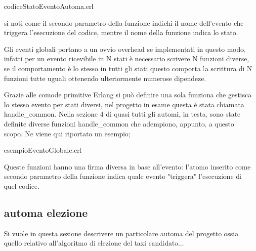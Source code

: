 codiceStatoEventoAutoma.erl

si noti come il secondo parametro della funzione indichi il nome dell'evento che triggera l'esecuzione del codice, mentre il nome della funzione indica lo stato.

Gli eventi globali portano a un ovvio overhead se implementati in questo modo, infatti per un evento ricevibile in N stati è necessario scrivere N funzioni diverse, se il comportamento è lo stesso in tutti gli stati questo comporta la scrittura di N funzioni tutte uguali ottenendo ulteriormente numerose dipendeze.

Grazie alle comode primitive Erlang si può definire una sola funziona che gestisca lo stesso evento per stati diversi, nel progetto in esame questa è stata chiamata handle\_common. Nella sezione 4 di quasi tutti gli automi, in testa, sono state definite diverse funzioni handle\_common che adempiono, appunto, a questo scopo. Ne viene qui riportato un esempio;

esempioEventoGlobale.erl

Queste funzioni hanno una firma diversa in base all'evento: l'atomo inserito come secondo parametro della funzione indica quale evento "triggera" l'esecuzione di quel codice.

\subsection{automa elezione}

Si vuole in questa sezione descrivere un particolare automa del progetto ossia quello relativo all'algoritmo di elezione del taxi candidato...
